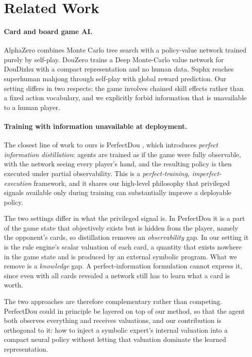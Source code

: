 \documentclass[11pt]{article}
\begin{document}
\section{Related Work}

\paragraph{Card and board game AI.} AlphaZero \cite{silver2018} combines Monte Carlo tree
search with a policy-value network trained purely by self-play. DouZero
\cite{zha2021douzero} trains a Deep Monte-Carlo value network for DouDizhu with a compact
representation and no human data. Suphx \cite{li2020suphx} reaches superhuman mahjong
through self-play with global reward prediction. Our setting differs in two respects: the
game involves chained skill effects rather than a fixed action vocabulary, and we
explicitly forbid information that is unavailable to a human player.

\paragraph{Training with information unavailable at deployment.} The closest line of work
to ours is PerfectDou \cite{yang2022perfectdou}, which introduces \emph{perfect information
distillation}: agents are trained as if the game were fully observable, with the network
seeing every player's hand, and the resulting policy is then executed under partial
observability. This is a \emph{perfect-training, imperfect-execution} framework, and it
shares our high-level philosophy that privileged signals available only during training can
substantially improve a deployable policy.

The two settings differ in what the privileged signal is. In PerfectDou it is a part of the
game state that objectively exists but is hidden from the player, namely the opponent's
cards, so distillation removes an \emph{observability} gap. In our setting it is the rule
engine's scalar valuation of each card, a quantity that exists nowhere in the game state
and is produced by an external symbolic program. What we remove is a \emph{knowledge} gap.
A perfect-information formulation cannot express it, since even with all cards revealed a
network still has to learn what a card is worth.

The two approaches are therefore complementary rather than competing. PerfectDou could in
principle be layered on top of our method, so that the agent both observes everything and
receives valuations, and our contribution is orthogonal to it: how to inject a symbolic
expert's internal valuation into a compact neural policy without letting that valuation
dominate the learned representation.
\end{document}
